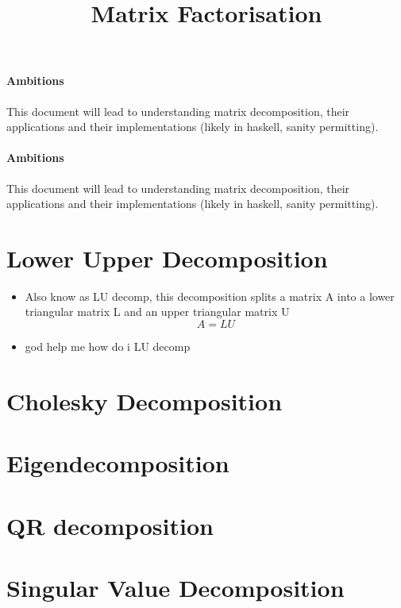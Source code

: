 \documentclass{article}
\title{Matrix Factorisation}
\begin{document}
\paragraph{Ambitions}
This document will lead to understanding matrix decomposition, their applications and their implementations (likely in haskell, sanity permitting).
\paragraph{Ambitions}
This document will lead to understanding matrix decomposition, their applications and their implementations (likely in haskell, sanity permitting).
\section{Lower Upper Decomposition}
\begin{itemize}
    \item Also know as LU decomp, this decomposition splits a matrix A into a lower triangular matrix L and an upper triangular matrix U
        \begin{equation}
            A = LU
        \end{equation}
    \item god help me how do i LU decomp
\end{itemize}
\section{Cholesky Decomposition}
\section{Eigendecomposition}
\section{QR decomposition}
\section{Singular Value Decomposition}
\end{document}
